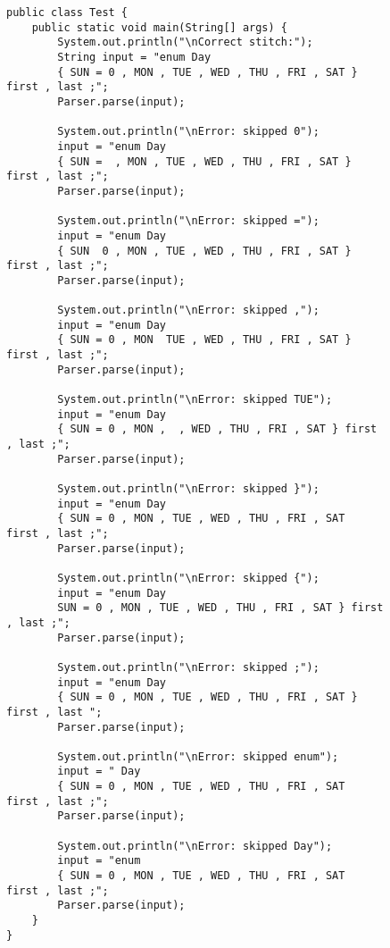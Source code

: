 \documentclass[a4paper, 14pt]{extarticle}
\begin{document}
\begin{figure}[!htb]
\begin{lstlisting}[language={},caption={Test.java},label={lst:code1}]
public class Test {
    public static void main(String[] args) {
        System.out.println("\nCorrect stitch:");
        String input = "enum Day 
        { SUN = 0 , MON , TUE , WED , THU , FRI , SAT } first , last ;";
        Parser.parse(input);

        System.out.println("\nError: skipped 0");
        input = "enum Day 
        { SUN =  , MON , TUE , WED , THU , FRI , SAT } first , last ;";
        Parser.parse(input);

        System.out.println("\nError: skipped =");
        input = "enum Day 
        { SUN  0 , MON , TUE , WED , THU , FRI , SAT } first , last ;";
        Parser.parse(input);

        System.out.println("\nError: skipped ,");
        input = "enum Day 
        { SUN = 0 , MON  TUE , WED , THU , FRI , SAT } first , last ;";
        Parser.parse(input);

        System.out.println("\nError: skipped TUE");
        input = "enum Day 
        { SUN = 0 , MON ,  , WED , THU , FRI , SAT } first , last ;";
        Parser.parse(input);

        System.out.println("\nError: skipped }");
        input = "enum Day 
        { SUN = 0 , MON , TUE , WED , THU , FRI , SAT  first , last ;";
        Parser.parse(input);

        System.out.println("\nError: skipped {");
        input = "enum Day 
        SUN = 0 , MON , TUE , WED , THU , FRI , SAT } first , last ;";
        Parser.parse(input);

        System.out.println("\nError: skipped ;");
        input = "enum Day 
        { SUN = 0 , MON , TUE , WED , THU , FRI , SAT } first , last ";
        Parser.parse(input);

        System.out.println("\nError: skipped enum");
        input = " Day 
        { SUN = 0 , MON , TUE , WED , THU , FRI , SAT  first , last ;";
        Parser.parse(input);

        System.out.println("\nError: skipped Day");
        input = "enum  
        { SUN = 0 , MON , TUE , WED , THU , FRI , SAT  first , last ;";
        Parser.parse(input);
    }
}
\end{lstlisting}
\end{figure}
\end{document}
